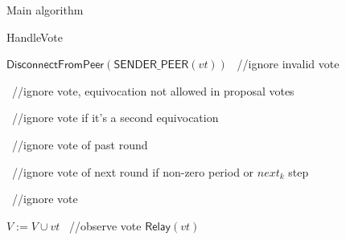 \documentclass[10pt,a4paper]{article}
\begin{document}
\begin{section}{Main algorithm}
\begin{subsection}{HandleVote}
\begin{algorithm}[H]
\begin{algorithmic}[1]
            
            
            


                \State $\mathsf{DisconnectFromPeer}(\mathsf{SENDER\_PEER}(vt))$
                \Return \ //ignore invalid vote
            \EndIf

                \Return \ //ignore vote, equivocation not allowed in proposal votes
            \EndIf

                \Return \ //ignore vote if it's a second equivocation
            \EndIf

                \Return \ //ignore vote of past round
            \EndIf

                \Return \ //ignore vote of next round if non-zero period or $next_k$ step
            \EndIf

                \Return \ //ignore vote
            \EndIf

            \State $V := V \cup vt$ \ //observe vote
            \State $\mathsf{Relay}(vt)$


\end{algorithmic}
\end{algorithm}
\end{subsection}
\end{section}
\end{document}
